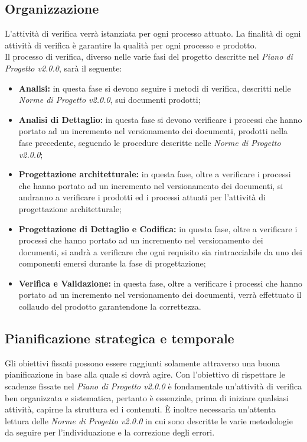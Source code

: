 \subsection{Organizzazione}
L'attività di verifica verrà istanziata per ogni processo attuato. La finalità di ogni attività di verifica è garantire la qualità per ogni processo e prodotto.\\
Il processo di verifica, diverso nelle varie fasi del progetto descritte nel \textit{Piano di Progetto v2.0.0}, sarà il seguente:
\begin{itemize}
	\item \textbf{Analisi:} in questa fase si devono seguire i metodi di verifica, descritti nelle \textit{Norme di Progetto v2.0.0}, sui documenti prodotti;
	\item \textbf{Analisi di Dettaglio:} in questa fase si devono verificare i processi che hanno portato ad un incremento nel \gls{versionamento} dei documenti, prodotti nella fase precedente, seguendo le procedure descritte nelle \textit{Norme di Progetto v2.0.0};
	\item \textbf{Progettazione architetturale:} in questa fase, oltre a verificare i processi che hanno portato ad un incremento nel \gls{versionamento} dei documenti, si andranno a verificare i prodotti ed i processi attuati per l'attività di progettazione architetturale;
	\item \textbf{Progettazione di Dettaglio e Codifica:} in questa fase, oltre a verificare i processi che hanno portato ad un incremento nel \gls{versionamento} dei documenti, si andrà a verificare che ogni requisito sia rintracciabile da uno dei componenti emersi durante la fase di progettazione;
	\item \textbf{Verifica e Validazione:} in questa fase, oltre a verificare i processi che hanno portato ad un incremento nel \gls{versionamento} dei documenti, verrà effettuato il collaudo del prodotto garantendone la correttezza.
\end{itemize} 

\subsection{Pianificazione strategica e temporale}
Gli obiettivi fissati possono essere raggiunti solamente attraverso una buona pianificazione in base alla quale si dovrà agire. Con l'obiettivo di rispettare le scadenze fissate nel \textit{Piano di Progetto v2.0.0} è fondamentale un'attività di verifica ben organizzata e sistematica, pertanto è essenziale, prima di iniziare qualsiasi attività, capirne la struttura ed i contenuti. È inoltre necessaria un'attenta lettura delle \textit{Norme di Progetto v2.0.0} in cui sono descritte le varie metodologie da seguire per l'individuazione e la correzione degli errori.

